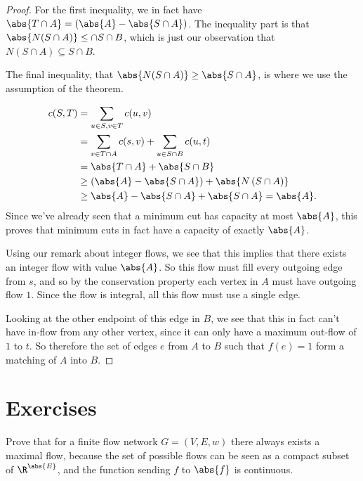 \documentclass[nobib]{tufte-handout}
\begin{document}
\begin{theorem}
\begin{proof}
{        For the first inequality, we in fact have $\abs{T\cap A} = (\abs{A} - \abs{S \cap A})$. The inequality part is that $\abs{N(S\cap A)} \leq \cap{S\cap B}$, which is just our observation that $N(S \cap A) \subseteq S \cap B$.
        
        The final inequality, that $\abs{N(S\cap A)} \geq \abs{S \cap A}$, is where we use the assumption of the theorem.}
        \begin{align*}
            c(S,T) &= \sum_{u \in S, v \in T} c(u,v)\\
            &= \sum_{v \in T \cap A} c(s,v) + \sum_{u \in S\cap B} c(u,t)\\
            &= \abs{T \cap A} + \abs{S \cap B}\\
            &\geq \left(\abs{A} - \abs{S\cap A}\right) + \abs{N\left(S\cap A\right)}\\
            &\geq \abs{A} - \abs{S\cap A} + \abs{S\cap A} = \abs{A}.
        \end{align*}
        Since we've already seen that a minimum cut has capacity at most $\abs{A}$, this proves that minimum cuts in fact have a capacity of exactly $\abs{A}$.

        Using our remark about integer flows, we see that this implies that there exists an integer flow with value $\abs{A}$. So this flow must fill every outgoing edge from $s$, and so by the conservation property each vertex in $A$ must have outgoing flow $1$. Since the flow is integral, all this flow must use a single edge.

        Looking at the other endpoint of this edge in $B$, we see that this in fact can't have in-flow from any other vertex, since it can only have a maximum out-flow of $1$ to $t$. So therefore the set of edges $e$ from $A$ to $B$ such that $f(e) = 1$ form a matching of $A$ into $B$.
    \end{proof}
\end{theorem}

\section{Exercises}

\begin{xca}
    Prove that for a finite flow network $G = (V,E,w)$ there always exists a maximal flow, because the set of possible flows can be seen as a compact subset of $\R^{\abs{E}}$, and the function sending $f$ to $\abs{f}$ is continuous.
\end{xca}

%
%
\end{document}
